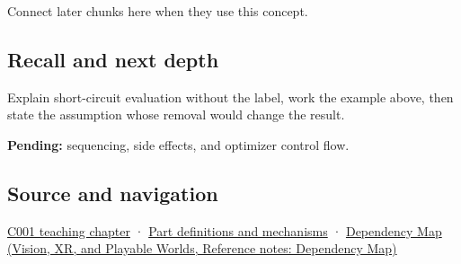 Connect later chunks here when they use this concept.

\subsection{Recall and next depth}\label{appendix-2e245a6fa8d3-recall-and-next-depth}

Explain short-circuit evaluation without the label, work the example above, then state the assumption whose removal would change the result.

\textbf{Pending:} sequencing, side effects, and optimizer control flow.

\subsection{Source and navigation}\label{appendix-2e245a6fa8d3-source-and-navigation}

\hyperref[01-foundations-i-ch001-from-a-signal-to-an-interpretation]{C001 teaching chapter} · \hyperref[appendix-fd090d982a15]{Part definitions and mechanisms} · \href{../07-Vision-XR-and-Playable-Worlds/main.pdf\#nameddest=appendix-4ad47bdd269a}{Dependency Map (Vision, XR, and Playable Worlds, Reference notes: Dependency Map)}
